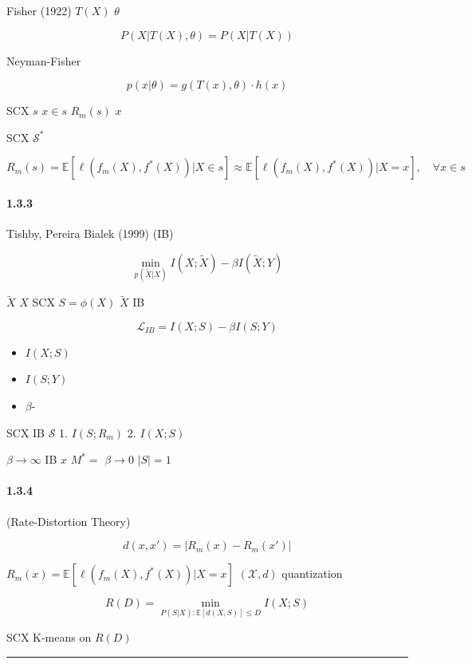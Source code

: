 \documentclass[
  12pt,
]{article}
\providecommand{\tightlist}{%
  \setlength{\itemsep}{0pt}\setlength{\parskip}{0pt}}
\begin{document}
Fisher (1922)  \(T(X)\)  \(\theta\)


\[P(X|T(X), \theta) = P(X|T(X))\]

 Neyman-Fisher 

\[p(x|\theta) = g(T(x), \theta) \cdot h(x)\]

 SCX  \(s\) 
\(x \in s\) \(R_m(s)\)
 \(x\) 

SCX  \(\mathcal{S}^*\) 

\[R_m(s) = \mathbb{E}[\ell(f_m(X), f^*(X)) | X \in s] \approx \mathbb{E}[\ell(f_m(X), f^*(X)) | X = x], \quad \forall x \in s\]



\paragraph{1.3.3
}\label{ux4fe1ux606fux74f6ux9888ux539fux7406}

Tishby, Pereira  Bialek (1999)  (IB)


\[\min_{p(\tilde{X}|X)} I(X; \tilde{X}) - \beta I(\tilde{X}; Y)\]

 \(\tilde{X}\)  \(X\)  SCX 
\(S = \phi(X)\)  \(\tilde{X}\) IB 

\[\mathcal{L}_{IB} = I(X; S) - \beta I(S; Y)\]

\begin{itemize}
\tightlist
\item
  \(I(X; S)\)
\item
  \(I(S; Y)\)
\item
  \(\beta\)-
\end{itemize}

SCX  IB 
\(\mathcal{S}\) 1. 
\(I(S; R_m)\) 2.  \(I(X; S)\)

 \(\beta \to \infty\) IB  \(x\)
\(M^* = \text{}\)
\(\beta \to 0\) \(|S| = 1\)

\paragraph{1.3.4
}\label{ux7387ux5931ux771fux7406ux8bbaux89c6ux89d2}

 (Rate-Distortion Theory)


\[d(x, x') = |R_m(x) - R_m(x')|\]

 \(R_m(x) = \mathbb{E}[\ell(f_m(X), f^*(X)) | X = x]\)
 \((\mathcal{X}, d)\)
quantization

\[R(D) = \min_{P(S|X): \mathbb{E}[d(X, S)] \leq D} I(X; S)\]

SCX  K-means on  \(R(D)\) 

\begin{center}\rule{0.5\linewidth}{0.5pt}\end{center}
\end{document}
